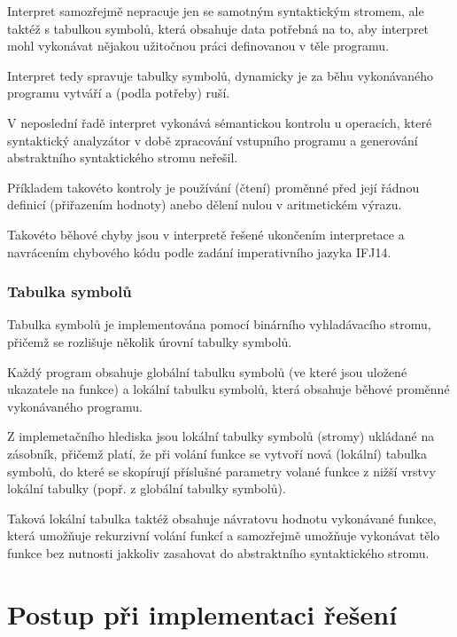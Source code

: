 \documentclass[12pt,a4paper,titlepage,final]{article}
\begin{document}
Interpret samozřejmě nepracuje jen se samotným syntaktickým stromem, ale
taktéž s tabulkou symbolů, která obsahuje data potřebná na to, aby interpret
mohl vykonávat nějakou užitočnou práci definovanou v těle programu.

Interpret tedy spravuje tabulky symbolů, dynamicky je za běhu
vykonávaného programu vytváří a (podla potřeby) ruší.

V neposlední řadě interpret vykonává sémantickou kontrolu u operacích, které
syntaktický analyzátor v době zpracování vstupního programu a generování
abstraktního syntaktického stromu neřešil.

Příkladem takovéto kontroly je používání (čtení) proměnné před její řádnou
definicí (přiřazením hodnoty) anebo dělení nulou v aritmetickém výrazu.

Takovéto běhové chyby jsou v interpretě řešené ukončením interpretace a navrácením
chybového kódu podle zadání imperativního jazyka IFJ14.

\subsubsection{Tabulka symbolů} \label{tabulka_symbolu}

Tabulka symbolů je implementována pomocí binárního vyhladávacího stromu,
přičemž se rozlišuje několik úrovní tabulky symbolů.

Každý program obsahuje globální tabulku symbolů (ve které jsou uložené ukazatele
na funkce) a lokální tabulku symbolů, která obsahuje běhové proměnné
vykonávaného programu.

Z implemetačního hlediska jsou lokální tabulky symbolů (stromy) ukládané na
zásobník, přičemž platí, že při volání funkce se vytvoří nová (lokální)
tabulka symbolů, do které se skopírují příslušné parametry volané funkce z
nižší vrstvy lokální tabulky (popř. z globální tabulky symbolů).

Taková lokální tabulka taktéž obsahuje návratovu hodnotu vykonávané funkce,
která umožňuje rekurzivní volání funkcí a samozřejmě umožňuje vykonávat tělo
funkce bez nutnosti jakkoliv zasahovat do abstraktního syntaktického stromu.


\section{Postup při implementaci řešení} \label{postup_pri_implementaci_reseni}
\end{document}
